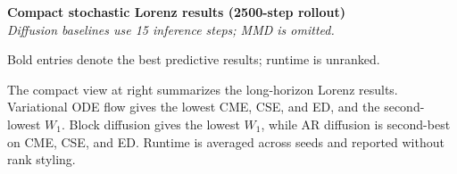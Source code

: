 \begin{table}
\centering
\begingroup
\scriptsize
\textbf{Compact stochastic Lorenz results (2500-step rollout)}\\[-0.15em]
\textit{Diffusion baselines use 15 inference steps; MMD is omitted.}
\par\vspace{0.35em}
\setlength{\tabcolsep}{2pt}
\par\vspace{0.25em}
\scriptsize Bold entries denote the best predictive results; runtime is
unranked.
\endgroup
\end{table}

\begingroup
\raggedright
\noindent
The compact view at right summarizes the long-horizon Lorenz results.
Variational ODE flow gives the lowest CME, CSE, and ED, and the second-lowest
$W_1$.  Block diffusion gives the lowest $W_1$,
while AR diffusion is second-best on CME, CSE, and ED.  Runtime is averaged
across seeds and reported without rank styling.
\par
\endgroup

